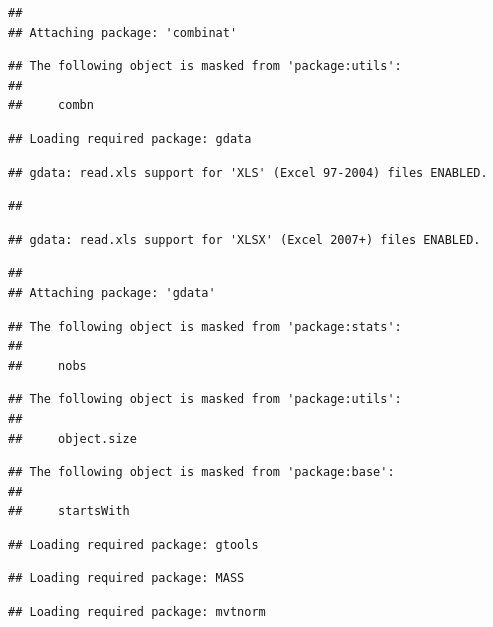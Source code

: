 \documentclass[
]{article}
\begin{document}
\begin{verbatim}
## 
## Attaching package: 'combinat'
\end{verbatim}

\begin{verbatim}
## The following object is masked from 'package:utils':
## 
##     combn
\end{verbatim}

\begin{verbatim}
## Loading required package: gdata
\end{verbatim}

\begin{verbatim}
## gdata: read.xls support for 'XLS' (Excel 97-2004) files ENABLED.
\end{verbatim}

\begin{verbatim}
## 
\end{verbatim}

\begin{verbatim}
## gdata: read.xls support for 'XLSX' (Excel 2007+) files ENABLED.
\end{verbatim}

\begin{verbatim}
## 
## Attaching package: 'gdata'
\end{verbatim}

\begin{verbatim}
## The following object is masked from 'package:stats':
## 
##     nobs
\end{verbatim}

\begin{verbatim}
## The following object is masked from 'package:utils':
## 
##     object.size
\end{verbatim}

\begin{verbatim}
## The following object is masked from 'package:base':
## 
##     startsWith
\end{verbatim}

\begin{verbatim}
## Loading required package: gtools
\end{verbatim}

\begin{verbatim}
## Loading required package: MASS
\end{verbatim}

\begin{verbatim}
## Loading required package: mvtnorm
\end{verbatim}
\end{document}
